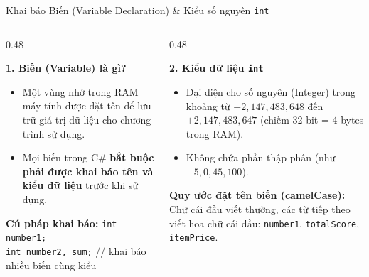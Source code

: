 \documentclass[aspectratio=169, 10pt]{beamer}
\begin{document}
\begin{frame}{Khai báo Biến (Variable Declaration) \& Kiểu số nguyên \texttt{int}}
  \begin{columns}[T]
    \begin{column}{0.48\textwidth}
      \begin{block}{\textbf{1. Biến (Variable) là gì?}}
        \begin{itemize}\small
          \item Một vùng nhớ trong RAM máy tính được đặt tên để lưu trữ giá trị dữ liệu cho chương trình sử dụng.
          \item Mọi biến trong C\# \textbf{bắt buộc phải được khai báo tên và kiểu dữ liệu} trước khi sử dụng.
        \end{itemize}
      \end{block}

      \begin{exampleblock}{\textbf{Cú pháp khai báo:}}
        \texttt{int number1;}\\
        \texttt{int number2, sum;} // khai báo nhiều biến cùng kiểu
      \end{exampleblock}
    \end{column}

    \begin{column}{0.48\textwidth}
      \begin{block}{\textbf{2. Kiểu dữ liệu \texttt{int}}}
        \begin{itemize}\small
          \item Đại diện cho số nguyên (Integer) trong khoảng từ $-2,147,483,648$ đến $+2,147,483,647$ (chiếm 32-bit = 4 bytes trong RAM).
          \item Không chứa phần thập phân (như $-5, 0, 45, 100$).
        \end{itemize}
      \end{block}

      \begin{exampleblock}{\textbf{Quy ước đặt tên biến (camelCase):}}
        Chữ cái đầu viết thường, các từ tiếp theo viết hoa chữ cái đầu: \texttt{number1}, \texttt{totalScore}, \texttt{itemPrice}.
      \end{exampleblock}
    \end{column}
  \end{columns}
\end{frame}
\end{document}
